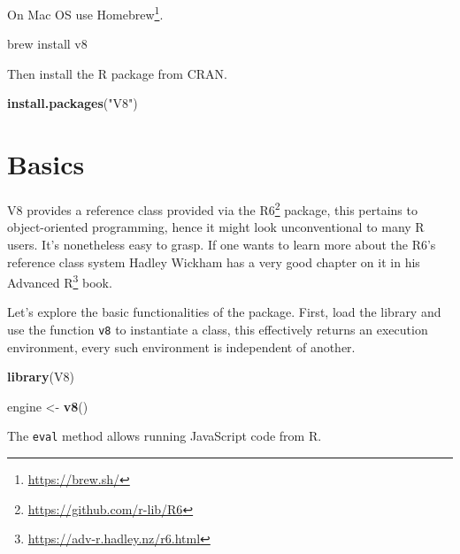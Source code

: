 \documentclass[
]{krantz}
\makeatletter
\newenvironment{Shaded}{\begin{snugshade}}{\end{snugshade}}
\newcommand{\CommentTok}[1]{\textcolor[rgb]{0.37,0.37,0.37}{\textit{#1}}}
\newcommand{\ExtensionTok}[1]{#1}
\newcommand{\KeywordTok}[1]{\textcolor[rgb]{0.27,0.27,0.27}{\textbf{#1}}}
\newcommand{\NormalTok}[1]{#1}
\newcommand{\OperatorTok}[1]{\textcolor[rgb]{0.43,0.43,0.43}{\textbf{#1}}}
\newcommand{\StringTok}[1]{\textcolor[rgb]{0.5,0.5,0.5}{#1}}
\renewcommand{\href}[2]{#2\footnote{\url{#1}}}
\newenvironment{kframe}{%
\medskip{}
\setlength{\fboxsep}{.8em}
 \def\at@end@of@kframe{}%
 \ifinner\ifhmode%
  \def\at@end@of@kframe{\end{minipage}}%
  \begin{minipage}{\columnwidth}%
 \fi\fi%
 \def\FrameCommand##1{\hskip\@totalleftmargin \hskip-\fboxsep
 \colorbox{shadecolor}{##1}\hskip-\fboxsep
     \hskip-\linewidth \hskip-\@totalleftmargin \hskip\columnwidth}%
 \MakeFramed {\advance\hsize-\width
   \@totalleftmargin\z@ \linewidth\hsize
   \@setminipage}}%
 {\par\unskip\endMakeFramed%
 \at@end@of@kframe}
\renewenvironment{Shaded}{\begin{kframe}}{\end{kframe}}
\makeatother
\begin{document}
On Mac OS use \href{https://brew.sh/}{Homebrew}.

\begin{Shaded}
\begin{Highlighting}[]
\ExtensionTok{brew}\NormalTok{ install v8}
\end{Highlighting}
\end{Shaded}

Then install the R package from CRAN.

\begin{Shaded}
\begin{Highlighting}[]
\KeywordTok{install.packages}\NormalTok{(}\StringTok{"V8"}\NormalTok{)}
\end{Highlighting}
\end{Shaded}

\hypertarget{v8-basics}{%
\section{Basics}\label{v8-basics}}

V8 provides a reference class provided via the \href{https://github.com/r-lib/R6}{R6} \citep{R-R6} package, this pertains to object-oriented programming, hence it might look unconventional to many R users. It's nonetheless easy to grasp. If one wants to learn more about the R6's reference class system Hadley Wickham has a very good chapter on it in his \href{https://adv-r.hadley.nz/r6.html}{Advanced R} book.

Let's explore the basic functionalities of the package. First, load the library and use the function \texttt{v8} to instantiate a class, this effectively returns an execution environment, every such environment is independent of another.

\begin{Shaded}
\begin{Highlighting}[]
\KeywordTok{library}\NormalTok{(V8)}

\NormalTok{engine \textless{}{-}}\StringTok{ }\KeywordTok{v8}\NormalTok{()}
\end{Highlighting}
\end{Shaded}

The \texttt{eval} method allows running JavaScript code from R.

\begin{Shaded}
\end{Shaded}
\end{document}
